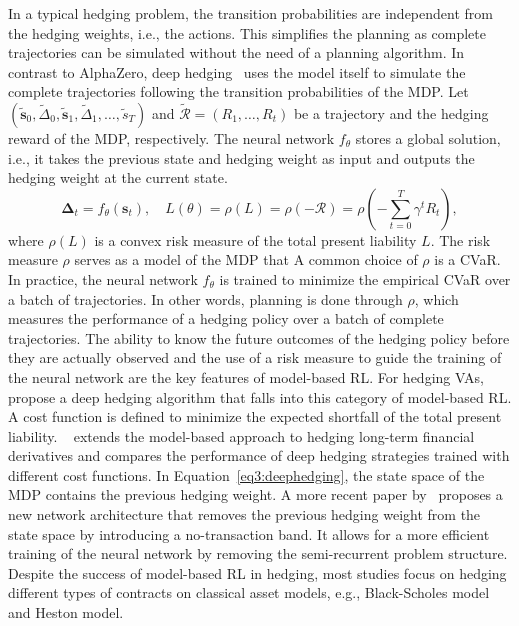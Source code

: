 In a typical hedging problem, the transition probabilities are independent from the hedging weights, i.e., the actions.
This simplifies the planning as complete trajectories can be simulated without the need of a planning algorithm.
In contrast to AlphaZero, deep hedging~\citep{buehler2019deep} uses the model itself to simulate the complete trajectories following the transition probabilities of the MDP.
Let $(\tilde{\mathbf{s}}_0, \tilde{\Delta}_0, \tilde{\mathbf{s}}_1, \tilde{\Delta}_1, \ldots, \tilde{s}_T)$ and $\tilde{\mathcal{R}} = (R_1, \ldots, R_t)$ be a trajectory and the hedging reward of the MDP, respectively.
The neural network $f_{\theta}$ stores a global solution, i.e., it takes the previous state and hedging weight as input and outputs the hedging weight at the current state.
\begin{equation} \label{eq3:deephedging}
    \mathbf{\Delta}_t = f_{\theta}(\mathbf{s}_t), \quad L(\theta) = \rho(L) = \rho(-\mathcal{R}) = \rho(- \sum_{t=0}^{T} \gamma^t R_t),
\end{equation}
where $\rho(L)$ is a convex risk measure of the total present liability $L$. 
The risk measure $\rho$ serves as a model of the MDP that 
A common choice of $\rho$ is a CVaR.
In practice, the neural network $f_{\theta}$ is trained to minimize the empirical CVaR over a batch of trajectories.
In other words, planning is done through $\rho$, which measures the performance of a hedging policy over a batch of complete trajectories.
The ability to know the future outcomes of the hedging policy before they are actually observed and the use of a risk measure to guide the training of the neural network are the key features of model-based RL.
For hedging VAs,~\cite{xu2020variable} propose a deep hedging algorithm that falls into this category of model-based RL.
A cost function is defined to minimize the expected shortfall of the total present liability.
~\cite{carbonneau2021deep} extends the model-based approach to hedging long-term financial derivatives and compares the performance of deep hedging strategies trained with different cost functions.
In Equation~\ref{eq3:deephedging}, the state space of the MDP contains the previous hedging weight.
A more recent paper by~\cite{imaki2021no} proposes a new network architecture that removes the previous hedging weight from the state space by introducing a no-transaction band.
It allows for a more efficient training of the neural network by removing the semi-recurrent problem structure.
Despite the success of model-based RL in hedging, most studies focus on hedging different types of contracts on classical asset models, e.g., Black-Scholes model and Heston model.
